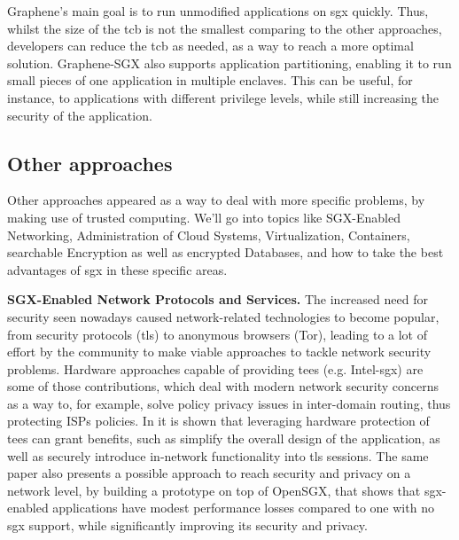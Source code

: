 Graphene's main goal is to run unmodified applications on \gls{sgx} quickly. Thus, whilst the size of the \gls{tcb} is not the smallest comparing to the other approaches, developers can reduce the \gls{tcb} as needed, as a way to reach a more optimal solution. 
Graphene-SGX also supports application partitioning, enabling it to run small pieces of one application in multiple enclaves. This can be useful, for instance, to applications with different privilege levels, while still increasing the security of the application.


\subsection{Other approaches}
\label{ssec:otherSGXFrameworks}

Other approaches appeared as a way to deal with more specific problems, by making use of trusted computing. We'll go into topics like SGX-Enabled Networking, Administration of Cloud Systems, Virtualization, Containers, searchable Encryption as well as encrypted Databases, and how to take the best advantages of \gls{sgx} in these specific areas. \newline


\textbf{SGX-Enabled Network Protocols and Services.} 
The increased need for security seen nowadays caused network-related technologies to become popular, from security protocols (\gls{tls}) to anonymous browsers (Tor), leading to a lot of effort by the community to make viable approaches to tackle network security problems. 
Hardware approaches capable of providing \gls{tee}s (e.g. Intel-\gls{sgx}) are some of those contributions, which deal with modern network security concerns as a way to, for example, solve policy privacy issues in inter-domain routing, thus protecting ISPs policies.
In \cite{torSGXPaper} it is shown that leveraging hardware protection of \gls{tee}s can grant benefits, such as simplify the overall design of the application, as well as securely introduce in-network functionality into \gls{tls} sessions. The same paper also presents a possible approach to reach security and privacy on a network level, by building a prototype on top of OpenSGX, that shows that \gls{sgx}-enabled applications have modest performance losses compared to one with no \gls{sgx} support, while significantly improving its security and privacy.

